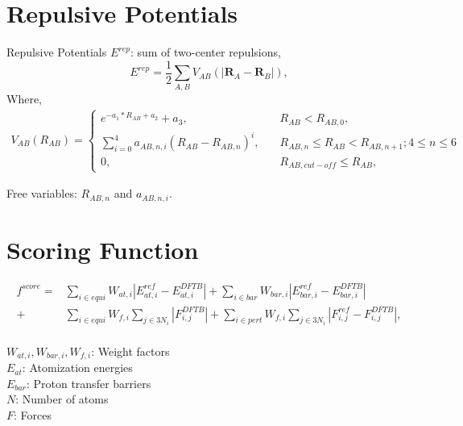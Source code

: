 \section{Repulsive Potentials}

Repulsive Potentials $E^{rep}$: sum of two-center repulsions,
\begin{equation}
E^{rep} = \frac{1}{2} \sum_{A,B} V_{AB}(|\mathbf{R}_A-\mathbf{R}_B|),
\label{ErepAB}
\end{equation} 
Where,
\begin{equation} 
\begin{aligned}
  V_{AB}(R_{AB})=
  \begin{cases}
    e^{-a_1*R_{AB}+a_2} + a_3,  \quad &R_{AB}<R_{AB,0},\\
    \sum_{i=0}^4 a_{AB,n,i} (R_{AB}-R_{AB,n})^i,  \quad &R_{AB,n}\leq R_{AB}<R_{AB,n+1}; 4 \le n \le 6\\
    0,  \quad &R_{AB,cut-off}\leq R_{AB},
  \end{cases}
\end{aligned}
\label{spline}
\end{equation}

Free variables: $R_{AB,n}$ and $a_{AB,n,i}$.

\section{Scoring Function}

\begin{equation} 
\begin{aligned}
  f^{score}=&\sum_{i\in equi} W_{at,i}\left|E^{ref}_{at,i}-E^{DFTB}_{at,i}\right| + \sum_{i\in bar} W_{bar,i}\left|E^{ref}_{bar,i}-E^{DFTB}_{bar,i}\right|\\
           +&\sum_{i\in equi} W_{f,i}\sum_{j\in 3N_i} \left|F^{DFTB}_{i,j}\right| + \sum_{i\in pert} W_{f,i}\sum_{j\in 3N_i} \left|F^{ref}_{i,j}-F^{DFTB}_{i,j}\right|,
\label{fscore}
\end{aligned}
\end{equation}\\
\vspace{0.5in}
$W_{at,i}, W_{bar,i}, W_{f,i}$:  Weight factors\\   
$E_{at}$: Atomization energies\\ 
$E_{bar}$: Proton transfer barriers\\  
$N$: Number of atoms\\
$F$: Forces\\  

